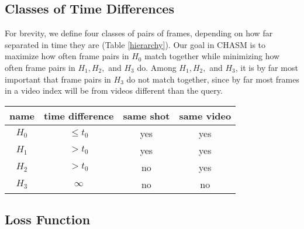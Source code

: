 \documentclass{article}
\renewenvironment{table}{\par\medskip\noindent\minipage{\linewidth}}{\endminipage\par\medskip}
\begin{document}
\begin{multicols}{2}
\subsection{Classes of Time Differences}

For brevity, we define four classes of pairs of frames, depending on how far separated in time they are (Table \ref{hierarchy}). Our goal in CHASM is to maximize how often frame pairs in $H_0$ match together while minimizing how often frame pairs in $H_1, H_2,$ and $H_3$ do. Among $H_1, H_2,$ and $H_3$, it is by far most important that frame pairs in $H_3$ do not match together, since by far most frames in a video index will be from videos different than the query.

\begin{table}
\begin{small}\begin{sc}\begin{center}
\begin{tabular}{cccc}
\hline
name & time difference & same shot & same video \\ \hline
$H_0$ & $\le t_0$ & yes & yes \\
$H_1$ & $>t_0$ & yes & yes \\
$H_2$ & $>t_0$ & no & yes \\
$H_3$ & $\infty$ & no & no \\ \hline
\end{tabular}\end{center}
\end{sc}
\end{small}
\label{hierarchy}
\end{table}


\subsection{Loss Function}


\end{multicols}
\end{document}
